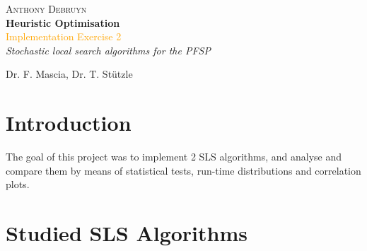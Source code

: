 \newcommand*{\titleTH}{\begingroup %
\raggedleft %
\vspace*{\baselineskip} %

{\Large \textsc{Anthony Debruyn}}\\[0.167\textheight] %

{\LARGE\bfseries Heuristic Optimisation}\\[\baselineskip] %

{\textcolor{Orange}{\Huge Implementation Exercise 2}}\\[\baselineskip] %

{\Large \textit{Stochastic local search algorithms for the PFSP}}\par %

\vfill %


{\large Dr. F. Mascia, Dr. T. Stützle \course}\par %

\endgroup}


 

\thispagestyle{empty}

\titleTH %

\newpage
\section{Introduction}
The goal of this project was to implement 2 SLS algorithms, and analyse and compare them by means of statistical tests, run-time distributions and correlation plots. 

\section{Studied SLS Algorithms}
